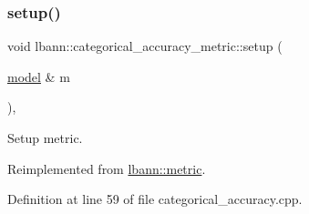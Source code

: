 \subsubsection{\texorpdfstring{setup()}{setup()}}
{\footnotesize\ttfamily void lbann\+::categorical\+\_\+accuracy\+\_\+metric\+::setup (\begin{DoxyParamCaption}\item[{\hyperlink{classlbann_1_1model}{model} \&}]{m }\end{DoxyParamCaption})\hspace{0.3cm}{\ttfamily [override]}, {\ttfamily [virtual]}}

Setup metric. 

Reimplemented from \hyperlink{classlbann_1_1metric_a898d23e410297378db2fe9f8d1754fe0}{lbann\+::metric}.



Definition at line 59 of file categorical\+\_\+accuracy.\+cpp.


